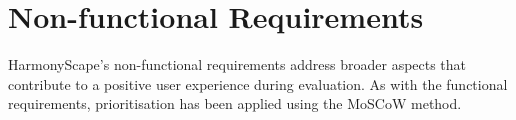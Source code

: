 \documentclass{l4proj}
\begin{document}

\section{Non-functional Requirements}
HarmonyScape's non-functional requirements address broader aspects that contribute to a positive user experience during evaluation. As with the functional requirements, prioritisation has been applied using the MoSCoW method.


\end{document}
